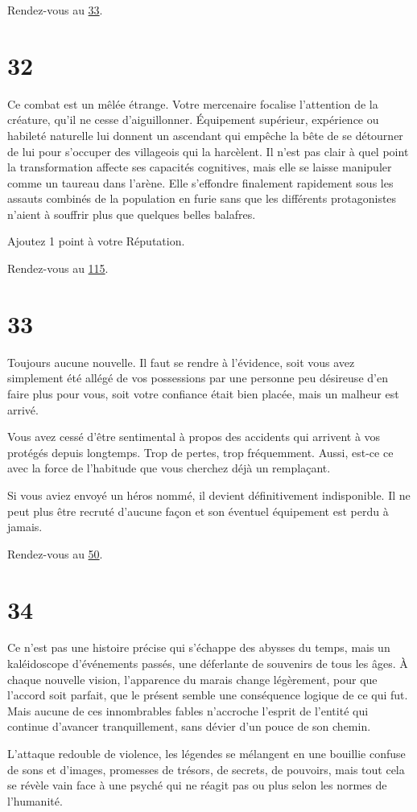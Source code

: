 \documentclass{report}
\newcommand{\gsection}[1]{
    \section{#1}
    \label{section-#1}
}
\newcommand{\glink}[1]{\hyperref[section-#1]{#1}}
\begin{document}
Rendez-vous au \glink{33}.

\gsection{32}

Ce combat est un mêlée étrange. Votre mercenaire focalise l'attention de la créature, qu'il ne cesse d'aiguillonner. Équipement supérieur, expérience ou habileté naturelle lui donnent un ascendant qui empêche la bête de se détourner de lui pour s'occuper des villageois qui la harcèlent. Il n'est pas clair à quel point la transformation affecte ses capacités cognitives, mais elle se laisse manipuler comme un taureau dans l'arène. Elle s'effondre finalement rapidement sous les assauts combinés de la population en furie sans que les différents protagonistes n'aient à souffrir plus que quelques belles balafres.

Ajoutez 1 point à votre Réputation.

Rendez-vous au \glink{115}.

\gsection{33}

Toujours aucune nouvelle. Il faut se rendre à l'évidence, soit vous avez simplement été allégé de vos possessions par une personne peu désireuse d'en faire plus pour vous, soit votre confiance était bien placée, mais un malheur est arrivé.

Vous avez cessé d'être sentimental à propos des accidents qui arrivent à vos protégés depuis longtemps. Trop de pertes, trop fréquemment. Aussi, est-ce ce avec la force de l'habitude que vous cherchez déjà un remplaçant.

Si vous aviez envoyé un héros nommé, il devient définitivement indisponible. Il ne peut plus être recruté d'aucune façon et son éventuel équipement est perdu à jamais.

Rendez-vous au \glink{50}.

\gsection{34}

Ce n'est pas une histoire précise qui s'échappe des abysses du temps, mais un kaléidoscope d'événements passés, une déferlante de souvenirs de tous les âges. À chaque nouvelle vision, l'apparence du marais change légèrement, pour que l'accord soit parfait, que le présent semble une conséquence logique de ce qui fut. Mais aucune de ces innombrables fables n'accroche l'esprit de l'entité qui continue d'avancer tranquillement, sans dévier d'un pouce de son chemin.

L'attaque redouble de violence, les légendes se mélangent en une bouillie confuse de sons et d'images, promesses de trésors, de secrets, de pouvoirs, mais tout cela se révèle vain face à une psyché qui ne réagit pas ou plus selon les normes de l'humanité.
\end{document}
